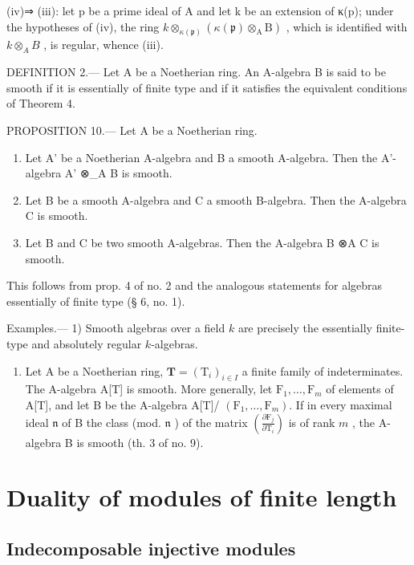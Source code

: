(iv)⇒ (iii): let p be a prime ideal of A and let k be an extension of κ(p); under the hypotheses of (iv), the ring \(k \otimes_{\kappa(\mathfrak{p})} (\kappa(\mathfrak{p}) \otimes_{\mathrm{A}} \mathrm{B})\) , which is identified with \(k \otimes_{A} B\) , is regular, whence (iii).

DEFINITION 2.--- Let A be a Noetherian ring. An A-algebra B is said to be smooth if it is essentially of finite type and if it satisfies the equivalent conditions of Theorem 4.

PROPOSITION 10.--- Let A be a Noetherian ring.

\begin{enumerate}
\def\labelenumi{\alph{enumi})}
\item
  Let A' be a Noetherian A-algebra and B a smooth A-algebra. Then the A'-algebra A' ⊗\_A B is smooth.
\item
  Let B be a smooth A-algebra and C a smooth B-algebra. Then the A-algebra C is smooth.
\item
  Let B and C be two smooth A-algebras. Then the A-algebra B ⊗A C is smooth.
\end{enumerate}

This follows from prop. 4 of no. 2 and the analogous statements for algebras essentially of finite type (§ 6, no. 1).

Examples.--- 1) Smooth algebras over a field \(k\) are precisely the essentially finite-type and absolutely regular \(k\)-algebras.

\begin{enumerate}
\def\labelenumi{\arabic{enumi})}
\setcounter{enumi}{1}
\tightlist
\item
  Let A be a Noetherian ring, \(\mathbf{T} = (\mathrm{T}_i)_{i\in I}\) a finite family of indeterminates. The A-algebra A{[}T{]} is smooth. More generally, let \(\mathrm{F}_1,\ldots ,\mathrm{F}_m\) of elements of A{[}T{]}, and let B be the A-algebra A{[}T{]}/ \((\mathrm{F}_1,\dots ,\mathrm{F}_m)\). If in every maximal ideal \(\mathfrak{n}\) of B the class (mod. \(\mathfrak{n}\) ) of the matrix \(\left(\frac{\partial\mathrm{F}_j}{\partial\mathrm{T}_i}\right)\) is of rank \(m\) , the A-algebra B is smooth (th. 3 of no. 9).
\end{enumerate}

\section{Duality of modules of finite length}

\subsection{Indecomposable injective modules}

